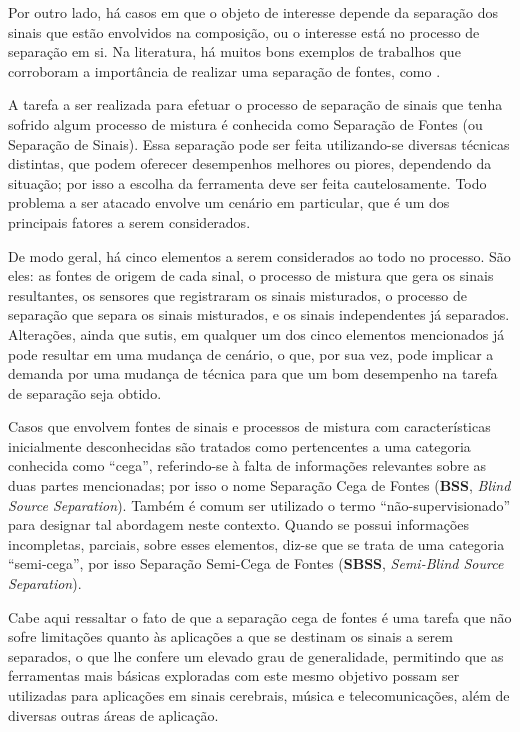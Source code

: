 Por outro lado, há casos em que o objeto de interesse depende da separação dos sinais que estão envolvidos na composição, ou o interesse está no processo de separação em si. Na literatura, há muitos bons exemplos de trabalhos que corroboram a importância de realizar uma separação de fontes, como \citep{belouchrani1997blind, nugraha2016multichannel}.

A tarefa a ser realizada para efetuar o processo de separação de sinais que tenha sofrido algum processo de mistura é conhecida como Separação de Fontes (ou Separação de Sinais). Essa separação pode ser feita utilizando-se diversas técnicas distintas, que podem oferecer desempenhos melhores ou piores, dependendo da situação; por isso a escolha da ferramenta deve ser feita cautelosamente. Todo problema a ser atacado envolve um cenário em particular, que é um dos principais fatores a serem considerados.

De modo geral, há cinco elementos a serem considerados ao todo no processo. São eles: as fontes de origem de cada sinal, o processo de mistura que gera os sinais resultantes, os sensores que registraram os sinais misturados, o processo de separação que separa os sinais misturados, e os sinais independentes já separados. Alterações, ainda que sutis, em qualquer um dos cinco elementos mencionados já pode resultar em uma mudança de cenário, o que, por sua vez, pode implicar a demanda por uma mudança de técnica para que um bom desempenho na tarefa de separação seja obtido.

Casos que envolvem fontes de sinais e processos de mistura com características inicialmente desconhecidas são tratados como pertencentes a uma categoria conhecida como ``cega'', referindo-se à falta de informações relevantes sobre as duas partes mencionadas; por isso o nome Separação Cega de Fontes (\textbf{BSS}, \textit{Blind Source Separation}). Também é comum ser utilizado o termo ``não-supervisionado'' para designar tal abordagem neste contexto. Quando se possui informações incompletas, parciais, sobre esses elementos, diz-se que se trata de uma categoria ``semi-cega'', por isso Separação Semi-Cega de Fontes (\textbf{SBSS}, \textit{Semi-Blind Source Separation}).


Cabe aqui ressaltar o fato de que a separação cega de fontes é uma tarefa que não sofre limitações quanto às aplicações a que se destinam os sinais a serem separados, o que lhe confere um elevado grau de generalidade, permitindo que as ferramentas mais básicas exploradas com este mesmo objetivo possam ser utilizadas para aplicações em sinais cerebrais, música e telecomunicações, além de diversas outras áreas de aplicação.

